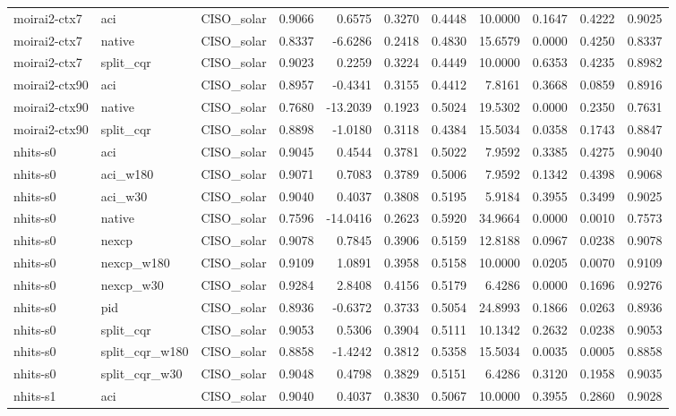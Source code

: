 \begin{tabular}{lllrrrrrrrr}
moirai2-ctx7 & aci & CISO_solar & 0.9066 & 0.6575 & 0.3270 & 0.4448 & 10.0000 & 0.1647 & 0.4222 & 0.9025 \\
moirai2-ctx7 & native & CISO_solar & 0.8337 & -6.6286 & 0.2418 & 0.4830 & 15.6579 & 0.0000 & 0.4250 & 0.8337 \\
moirai2-ctx7 & split_cqr & CISO_solar & 0.9023 & 0.2259 & 0.3224 & 0.4449 & 10.0000 & 0.6353 & 0.4235 & 0.8982 \\
moirai2-ctx90 & aci & CISO_solar & 0.8957 & -0.4341 & 0.3155 & 0.4412 & 7.8161 & 0.3668 & 0.0859 & 0.8916 \\
moirai2-ctx90 & native & CISO_solar & 0.7680 & -13.2039 & 0.1923 & 0.5024 & 19.5302 & 0.0000 & 0.2350 & 0.7631 \\
moirai2-ctx90 & split_cqr & CISO_solar & 0.8898 & -1.0180 & 0.3118 & 0.4384 & 15.5034 & 0.0358 & 0.1743 & 0.8847 \\
nhits-s0 & aci & CISO_solar & 0.9045 & 0.4544 & 0.3781 & 0.5022 & 7.9592 & 0.3385 & 0.4275 & 0.9040 \\
nhits-s0 & aci_w180 & CISO_solar & 0.9071 & 0.7083 & 0.3789 & 0.5006 & 7.9592 & 0.1342 & 0.4398 & 0.9068 \\
nhits-s0 & aci_w30 & CISO_solar & 0.9040 & 0.4037 & 0.3808 & 0.5195 & 5.9184 & 0.3955 & 0.3499 & 0.9025 \\
nhits-s0 & native & CISO_solar & 0.7596 & -14.0416 & 0.2623 & 0.5920 & 34.9664 & 0.0000 & 0.0010 & 0.7573 \\
nhits-s0 & nexcp & CISO_solar & 0.9078 & 0.7845 & 0.3906 & 0.5159 & 12.8188 & 0.0967 & 0.0238 & 0.9078 \\
nhits-s0 & nexcp_w180 & CISO_solar & 0.9109 & 1.0891 & 0.3958 & 0.5158 & 10.0000 & 0.0205 & 0.0070 & 0.9109 \\
nhits-s0 & nexcp_w30 & CISO_solar & 0.9284 & 2.8408 & 0.4156 & 0.5179 & 6.4286 & 0.0000 & 0.1696 & 0.9276 \\
nhits-s0 & pid & CISO_solar & 0.8936 & -0.6372 & 0.3733 & 0.5054 & 24.8993 & 0.1866 & 0.0263 & 0.8936 \\
nhits-s0 & split_cqr & CISO_solar & 0.9053 & 0.5306 & 0.3904 & 0.5111 & 10.1342 & 0.2632 & 0.0238 & 0.9053 \\
nhits-s0 & split_cqr_w180 & CISO_solar & 0.8858 & -1.4242 & 0.3812 & 0.5358 & 15.5034 & 0.0035 & 0.0005 & 0.8858 \\
nhits-s0 & split_cqr_w30 & CISO_solar & 0.9048 & 0.4798 & 0.3829 & 0.5151 & 6.4286 & 0.3120 & 0.1958 & 0.9035 \\
nhits-s1 & aci & CISO_solar & 0.9040 & 0.4037 & 0.3830 & 0.5067 & 10.0000 & 0.3955 & 0.2860 & 0.9028 \\

\end{tabular}

